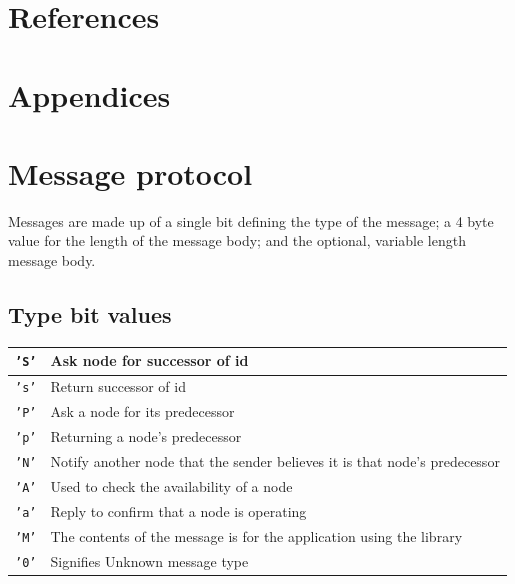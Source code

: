 \documentclass{article}
\begin{document}
\section{References}

%
%
\printbibliography


\section{Appendices}
\appendix
\section{Message protocol}

Messages are made up of a single bit defining the type of the message; a 4 byte value for the length of the message body; and the optional, variable length message body.

\subsection{Type bit values}
\begin{tabular}{|l | l|}
\hline
\texttt{'S'} & Ask node for successor of id \\\hline
\texttt{'s'} & Return successor of id \\\hline
\texttt{'P'} & Ask a node for its predecessor \\\hline
\texttt{'p'} & Returning a node's predecessor \\\hline
\texttt{'N'} & Notify another node that the sender believes it is that node's predecessor \\\hline
\texttt{'A'} & Used to check the availability of a node\\\hline
\texttt{'a'} & Reply to confirm that a node is operating \\\hline
\texttt{'M'} & The contents of the message is for the application using the library \\\hline
\texttt{'0'} & Signifies Unknown message type \\\hline
\end{tabular}
\end{document}
